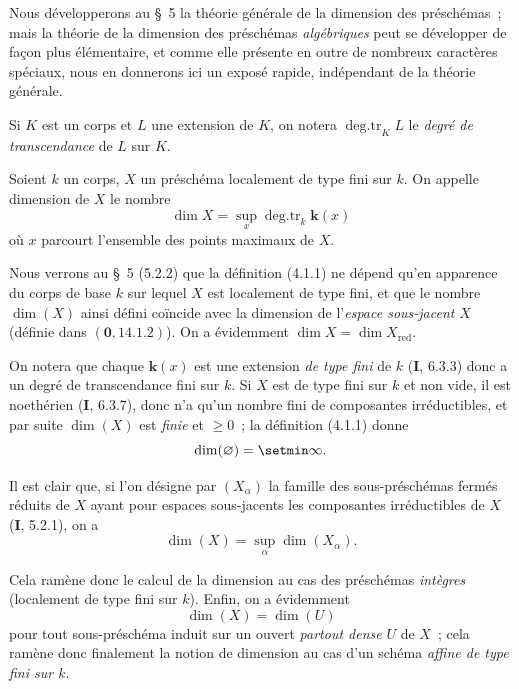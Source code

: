 Nous développerons au \S~5 la théorie générale de la dimension des préschémas~;
mais la théorie de la dimension des préschémas \emph{algébriques} peut se
développer de façon plus élémentaire, et comme elle présente en outre de
nombreux caractères spéciaux, nous en donnerons ici un exposé rapide,
indépendant de la théorie générale.

Si $K$ est un corps et $L$ une extension de $K$, on notera
$\operatorname{deg.tr}_K L$ le \emph{degré de transcendance} de $L$ sur $K$.

\begin{definition}[4.1.1]
\label{IV.2.4.1.1-fr}
Soient $k$ un corps, $X$ un préschéma localement de type fini sur $k$. On
appelle dimension de $X$ le nombre
\begin{equation}
\tag{4.1.1.1}
\label{IV.2.4.1.1.1-fr}
\dim X=\sup_x\operatorname{deg.tr}_k \boldsymbol{k}(x)
\end{equation}
où $x$ parcourt l'ensemble des points maximaux de $X$.
\end{definition}

Nous verrons au \S~5 (5.2.2) que la définition (4.1.1) ne dépend qu'en
apparence du corps de base $k$ sur lequel $X$ est localement de type fini, et
que le nombre $\dim(X)$ ainsi défini coïncide avec la dimension de
l'\emph{espace sous-jacent} $X$ (définie dans $(\mathbf{0},14.1.2)$). On a évidemment
$\dim X=\dim X_{\mathrm{red}}$.

On notera que chaque $\boldsymbol{k}(x)$ est une extension \emph{de type fini} de $k$
(\textbf{I}, 6.3.3) donc a un degré de transcendance fini sur $k$. Si $X$ est de type
fini sur $k$ et non vide, il est noethérien (\textbf{I}, 6.3.7), donc n'a qu'un nombre
fini de composantes irréductibles, et par suite $\dim(X)$ est \emph{finie} et
$\geqslant0$~; la définition (4.1.1) donne
\[
\dim(\varnothing)=\setmin\infty.
\]

Il est clair que, si l'on désigne par $(X_\alpha)$ la famille des
sous-préschémas fermés réduits de $X$ ayant pour espaces sous-jacents les
composantes irréductibles de $X$ (\textbf{I}, 5.2.1), on a
\begin{equation}
\tag{4.1.1.2}
\label{IV.2.4.1.1.2-fr}
\dim(X)=\sup_\alpha\dim(X_\alpha).
\end{equation}

Cela ramène donc le calcul de la dimension au cas des préschémas \emph{intègres}
(localement de type fini sur $k$). Enfin, on a évidemment
\begin{equation}
\tag{4.1.1.3}
\label{IV.2.4.1.1.3-fr}
\dim(X)=\dim(U)
\end{equation}
pour tout sous-préschéma induit sur un ouvert \emph{partout dense} $U$ de
$X$~; cela ramène donc finalement la notion de dimension au cas d'un schéma
\emph{affine de type fini sur $k$}.

